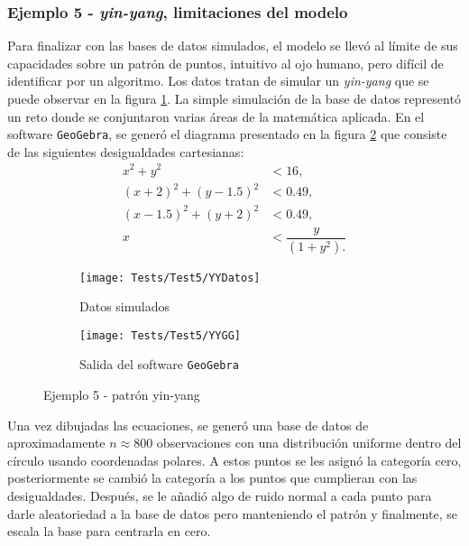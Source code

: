 \documentclass[../Main/Main.tex]{subfiles}
\begin{document}
\subsubsection*{Ejemplo 5 - \textit{yin-yang}, limitaciones del modelo}
Para finalizar con las bases de datos simulados, el modelo se llevó al límite de sus capacidades sobre un patrón de puntos, intuitivo al ojo humano, pero difícil de identificar por un algoritmo. Los datos tratan de simular un \textit{yin-yang} que se puede observar en la figura \ref{fig:YYDatos}. La simple simulación de la base de datos representó un reto donde se conjuntaron varias áreas de la matemática aplicada. En el software \verb|GeoGebra|, se generó el diagrama presentado en la figura \ref{fig:YYGG} que consiste de las siguientes desigualdades cartesianas:
\begin{align*}
	x^2 + y^2 &< 16, \\
	(x+2)^2 + (y-1.5)^2 &< 0.49, \\
	(x-1.5)^2 + (y+2)^2 &< 0.49, \\[4pt]
	x &< \dfrac{y}{(1+y^2).}
\end{align*}

\begin{figure}[h]
        \centering
        \begin{subfigure}[t]{0.45\textwidth}
            \centering
            \texttt{[image: Tests/Test5/YYDatos]}
            \caption{Datos simulados}   
            \label{fig:YYDatos}
        \end{subfigure}
        \hfill
        \begin{subfigure}[t]{0.45\textwidth}  
            \centering 
            \texttt{[image: Tests/Test5/YYGG]}
            \caption{Salida del software \texttt{GeoGebra}}
            \label{fig:YYGG}
        \end{subfigure}
        \caption{Ejemplo 5 - patrón yin-yang}
        \label{fig:YYInitialPlots}
\end{figure}
Una vez dibujadas las ecuaciones, se generó una base de datos de aproximadamente $n \approx \num{800}$ observaciones con una distribución uniforme dentro del círculo usando coordenadas polares. A estos puntos se les asignó la categoría cero, posteriormente se cambió la categoría a los puntos que cumplieran con las desigualdades. Después, se le añadió algo de ruido normal a cada punto para darle aleatoriedad a la base de datos pero manteniendo el patrón y finalmente, se escala la base para centrarla en cero.  
\end{document}
